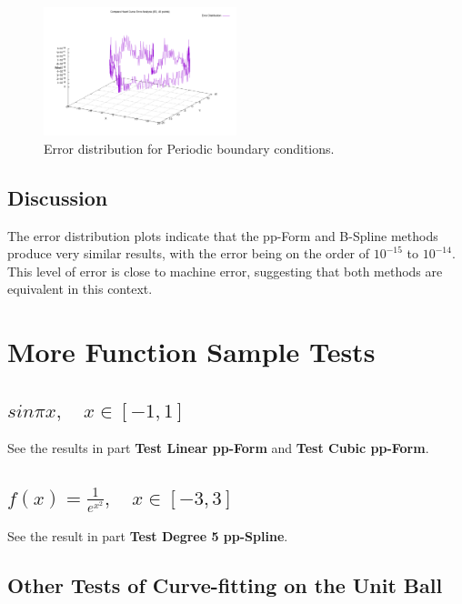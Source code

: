 \documentclass{article}
\begin{document}
\begin{figure}[H]
    \centering
    \includegraphics[width=0.5\textwidth]{../figure/compare_3heartspline_error3d_40.png}
    \caption{Error distribution for Periodic boundary conditions.}
    \label{fig:b3_error}
\end{figure}

\subsection{Discussion}
The error distribution plots indicate that the pp-Form and B-Spline methods produce very similar results, with the error being on the order of $10^{-15}$ to $10^{-14}$. This level of error is close to machine error, suggesting that both methods are equivalent in this context.


\section{More Function Sample Tests}
\subsection{\(sin \pi x, \quad x\in [-1, 1]\)}
See the results in part \textbf{Test Linear pp-Form} and \textbf{Test Cubic pp-Form}.

\subsection{\( f(x) = \frac{1}{e^{x^2}}, \quad x\in [-3, 3] \)}
See the result in part \textbf{Test Degree 5 pp-Spline}.

\subsection{Other Tests of Curve-fitting on the Unit Ball}
\end{document}

